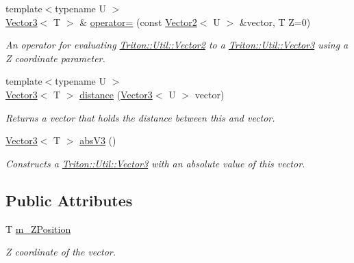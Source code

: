\begin{DoxyCompactItemize}
{\footnotesize template$<$typename U $>$ }\\\hyperlink{class_triton_1_1_util_1_1_vector3}{Vector3}$<$ T $>$ \& \hyperlink{class_triton_1_1_util_1_1_vector3_ac27ac77c9ed4cca294ae21a51fa1cdfc}{operator=} (const \hyperlink{class_triton_1_1_util_1_1_vector2}{Vector2}$<$ U $>$ \&vector, T Z=0)
\begin{DoxyCompactList}\small\item\em An operator for evaluating \hyperlink{class_triton_1_1_util_1_1_vector2}{Triton\+::\+Util\+::\+Vector2} to a \hyperlink{class_triton_1_1_util_1_1_vector3}{Triton\+::\+Util\+::\+Vector3} using a Z coordinate parameter. \end{DoxyCompactList}\item 
{\footnotesize template$<$typename U $>$ }\\\hyperlink{class_triton_1_1_util_1_1_vector3}{Vector3}$<$ T $>$ \hyperlink{class_triton_1_1_util_1_1_vector3_a00f99640d34d3c596c5c665384249c3e}{distance} (\hyperlink{class_triton_1_1_util_1_1_vector3}{Vector3}$<$ U $>$ vector)
\begin{DoxyCompactList}\small\item\em Returns a vector that holds the distance between this and vector. \end{DoxyCompactList}\item 
\hyperlink{class_triton_1_1_util_1_1_vector3}{Vector3}$<$ T $>$ \hyperlink{class_triton_1_1_util_1_1_vector3_a3b86bff74414a8de65ce908a9e4a686f}{abs\+V3} ()
\begin{DoxyCompactList}\small\item\em Constructs a \hyperlink{class_triton_1_1_util_1_1_vector3}{Triton\+::\+Util\+::\+Vector3} with an absolute value of this vector. \end{DoxyCompactList}\end{DoxyCompactItemize}
\subsection*{Public Attributes}
\begin{DoxyCompactItemize}
\item 
T \hyperlink{class_triton_1_1_util_1_1_vector3_ac42aa6f29ac37a866b49cbc1d8e66f74}{m\+\_\+\+Z\+Position}
\begin{DoxyCompactList}\small\item\em Z coordinate of the vector. \end{DoxyCompactList}\end{DoxyCompactItemize}
